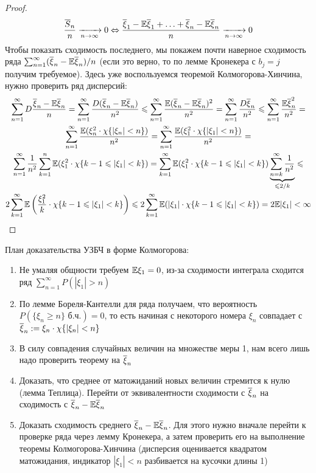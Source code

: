\begin{proof}
	\[
		\frac{\overline{S}_n}{n} \xrightarrow[n \to \infty]{} 0 \Leftrightarrow \frac{\overline{\xi}_1 - \mathbb{E}\overline{\xi}_1 + \ldots + \overline{\xi}_n - \mathbb{E}\overline{\xi}_n}{n} \xrightarrow[n \to \infty]{} 0
	\]
	Чтобы показать сходимость последнего, мы покажем почти наверное сходимость ряда $\sum_{n = 1}^\infty (\overline{\xi}_n - \mathbb{E}\overline{\xi}_n) / n$ (если это верно, то по лемме Кронекера с $b_j = j$ получим требуемое). Здесь уже воспользуемся теоремой Колмогорова-Хинчина, нужно проверить ряд дисперсий:
	\begin{multline*}
		\sum_{n = 1}^\infty D\frac{\overline{\xi}_n - \mathbb{E}\overline{\xi}_n}{n} = \sum_{n = 1}^\infty \frac{D(\overline{\xi}_n - \mathbb{E}\overline{\xi}_n)}{n^2} \leqslant \sum_{n = 1}^\infty \frac{\mathbb{E}(\overline{\xi}_n - \mathbb{E}\overline{\xi}_n)^2}{n^2} = \sum_{n = 1}^\infty \frac{D\overline{\xi}_n}{n^2} \leqslant \sum_{n = 1}^\infty \frac{\mathbb{E}\overline{\xi}_n^2}{n^2} =
		\\
		\sum_{n = 1}^\infty \frac{\mathbb{E}(\xi_n^2 \cdot \chi\{|\xi_n| < n\})}{n^2} = \sum_{n = 1}^\infty \frac{\mathbb{E}(\xi_1^2 \cdot \chi\{|\xi_1| < n\})}{n^2} =
		\\
		\sum_{n = 1}^\infty \frac{1}{n^2} \sum_{k = 1}^n \mathbb{E}(\xi_1^2 \cdot \chi\{k - 1 \leqslant |\xi_1| < k\}) = \sum_{k = 1}^\infty \mathbb{E}(\xi_1^2 \cdot \chi\{k - 1 \leqslant |\xi_1| < k\}) \underbrace{\sum_{n = k}^\infty \frac{1}{n^2}}_{\leqslant 2 / k} \leqslant
		\\
		2\sum_{k = 1}^\infty \mathbb{E}\left(\frac{\xi_1^2}{k} \cdot \chi\{k - 1 \leqslant |\xi_1| < k\}\right) \leqslant 2 \sum_{k = 1}^\infty \mathbb{E}(|\xi_1| \cdot \chi\{k - 1 \leqslant |\xi_1| < k\}) = 2\mathbb{E} |\xi_1| < \infty
	\end{multline*}
\end{proof}

\begin{anote}
	План доказательства УЗБЧ в форме Колмогорова:
	\begin{enumerate}
		\item Не умаляя общности требуем $\mathbb{E}\xi_1 = 0$, из-за сходимости интеграла сходится ряд $\sum_{n = 1}^\infty P(|\xi_1| > n)$
		
		\item По лемме Бореля-Кантелли для ряда получаем, что вероятность $P(\{\xi_n \ge n\} \text{ б.ч.}) = 0$, то есть начиная с некоторого номера $\xi_n$ совпадает с $\overline{\xi}_n := \xi_n \cdot \chi\{|\xi_n| < n\}$
		
		\item В силу совпадения случайных величин на множестве меры 1, нам всего лишь надо проверить теорему на $\overline{\xi}_n$
		
		\item Доказать, что среднее от матожиданий новых величин стремится к нулю (лемма Теплица). Перейти от эквивалентности сходимости с $\overline{\xi}_n$ на сходимость с $\overline{\xi}_n - \mathbb{E}\overline{\xi}_n$
		
		\item Доказать сходимость среднего $\overline{\xi}_n - \mathbb{E}\overline{\xi}_n$. Для этого нужно вначале перейти к проверке ряда через лемму Кронекера, а затем проверить его на выполнение теоремы Колмогорова-Хинчина (дисперсия оценивается квадратом матожидания, индикатор $|\xi_1| < n$ разбивается на кусочки длины 1)
	\end{enumerate}
\end{anote}